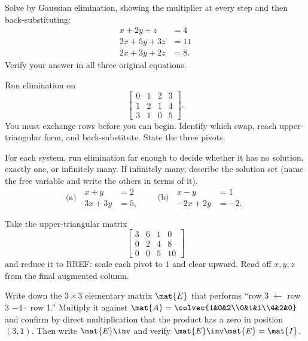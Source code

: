 \begin{exercise}
Solve by Gaussian elimination, showing the multiplier at every step and then
back-substituting:
\[
\begin{aligned}
x + 2y + z &= 4\\
2x + 5y + 3z &= 11\\
2x + 3y + 2z &= 8.
\end{aligned}
\]
Verify your answer in all three original equations.
\end{exercise}

\begin{exercise}
Run elimination on
\[
\left[\begin{array}{ccc|c}
0 & 1 & 2 & 3\\
1 & 2 & 1 & 4\\
3 & 1 & 0 & 5
\end{array}\right].
\]
You must exchange rows before you can begin. Identify which swap, reach
upper-triangular form, and back-substitute. State the three pivots.
\end{exercise}

\begin{exercise}
For each system, run elimination far enough to decide whether it has no solution,
exactly one, or infinitely many. If infinitely many, describe the solution set
(name the free variable and write the others in terms of it).
\[
\text{(a)}\;\;
\begin{aligned}
x + y &= 2\\
3x + 3y &= 5,
\end{aligned}
\qquad
\text{(b)}\;\;
\begin{aligned}
x - y &= 1\\
-2x + 2y &= -2.
\end{aligned}
\]
\end{exercise}

\begin{exercise}
Take the upper-triangular matrix
\[
\left[\begin{array}{ccc|c}
3 & 6 & 1 & 0\\
0 & 2 & 4 & 8\\
0 & 0 & 5 & 10
\end{array}\right]
\]
and reduce it to RREF: scale each pivot to $1$ and clear upward. Read off
$x,y,z$ from the final augmented column.
\end{exercise}

\begin{exercise}
Write down the $3\times 3$ elementary matrix $\mat{E}$ that performs ``row 3
$\leftarrow$ row 3 $-4\cdot$ row 1.'' Multiply it against
$\mat{A}=\colvec{1&0&2\\0&1&1\\4&2&0}$ and confirm by direct multiplication that
the product has a zero in position $(3,1)$. Then write $\mat{E}\inv$ and verify
$\mat{E}\inv\mat{E}=\mat{I}$.
\end{exercise}


